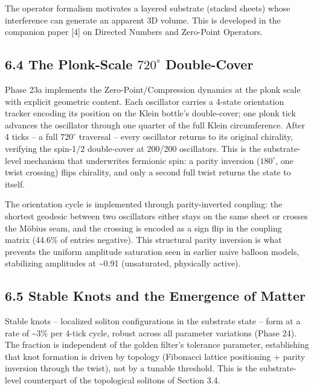 \documentclass[
  11pt,
]{article}
\begin{document}
The operator formalism motivates a layered substrate (stacked sheets)
whose interference can generate an apparent 3D volume. This is developed
in the companion paper {[}4{]} on Directed Numbers and Zero-Point
Operators.

\subsection{\texorpdfstring{6.4 The Plonk-Scale \(720^{\circ}\)
Double-Cover}{6.4 The Plonk-Scale 720\^{}\{\textbackslash circ\} Double-Cover}}\label{the-plonk-scale-720circ-double-cover}

Phase 23a implements the Zero-Point/Compression dynamics at the plonk
scale with explicit geometric content. Each oscillator carries a 4-state
orientation tracker encoding its position on the Klein bottle's
double-cover; one plonk tick advances the oscillator through one quarter
of the full Klein circumference. After 4 ticks -- a full \(720^{\circ}\)
traversal -- every oscillator returns to its original chirality,
verifying the spin-1/2 double-cover at 200/200 oscillators. This is the
substrate-level mechanism that underwrites fermionic spin: a parity
inversion (\(180^{\circ}\), one twist crossing) flips chirality, and
only a second full twist returns the state to itself.

The orientation cycle is implemented through parity-inverted coupling:
the shortest geodesic between two oscillators either stays on the same
sheet or crosses the Möbius seam, and the crossing is encoded as a sign
flip in the coupling matrix (44.6\% of entries negative). This
structural parity inversion is what prevents the uniform amplitude
saturation seen in earlier naive balloon models, stabilizing amplitudes
at \textasciitilde0.91 (unsaturated, physically active).

\subsection{6.5 Stable Knots and the Emergence of
Matter}\label{stable-knots-and-the-emergence-of-matter}

Stable knots -- localized soliton configurations in the substrate state
-- form at a rate of \textasciitilde3\% per 4-tick cycle, robust across
all parameter variations (Phase 24). The fraction is independent of the
golden filter's tolerance parameter, establishing that knot formation is
driven by topology (Fibonacci lattice positioning + parity inversion
through the twist), not by a tunable threshold. This is the
substrate-level counterpart of the topological solitons of Section 3.4.
\end{document}
